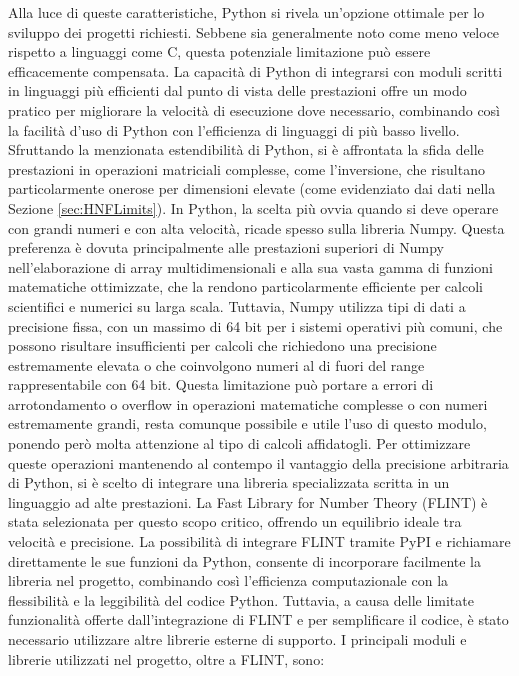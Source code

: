 Alla luce di queste caratteristiche, Python si rivela un'opzione ottimale per lo sviluppo 
dei progetti richiesti. Sebbene sia generalmente noto come meno veloce rispetto a 
linguaggi come C, questa potenziale limitazione può essere efficacemente compensata. 
La capacità di Python di integrarsi con moduli scritti in linguaggi più efficienti dal 
punto di vista delle prestazioni offre un modo pratico per migliorare la velocità di 
esecuzione dove necessario, combinando così la facilità d'uso di Python con l'efficienza 
di linguaggi di più basso livello.
Sfruttando la menzionata estendibilità di Python, si è affrontata la sfida delle prestazioni 
in operazioni matriciali complesse, come l'inversione, che risultano particolarmente onerose 
per dimensioni elevate (come evidenziato dai dati nella Sezione \ref{sec:HNFLimits}). 
In Python, la scelta più ovvia quando si deve operare con grandi numeri e con alta velocità,
ricade spesso sulla libreria Numpy. 
Questa preferenza è dovuta principalmente alle prestazioni superiori di Numpy nell'elaborazione 
di array multidimensionali e alla sua vasta gamma di funzioni matematiche ottimizzate, 
che la rendono particolarmente efficiente per calcoli scientifici e numerici su larga scala. 
Tuttavia, Numpy utilizza tipi di dati a precisione fissa, con un massimo di 64 bit per i 
sistemi operativi più comuni, che 
possono risultare insufficienti per calcoli che richiedono una precisione estremamente 
elevata o che coinvolgono numeri al di fuori del range rappresentabile con 64 bit. 
Questa limitazione può portare a errori di arrotondamento o overflow in operazioni 
matematiche complesse o con numeri estremamente grandi, resta comunque possibile e utile
l'uso di questo modulo, ponendo però molta attenzione al tipo di calcoli affidatogli.
Per ottimizzare queste operazioni mantenendo al contempo il vantaggio della precisione 
arbitraria di Python, si è scelto di integrare una libreria specializzata scritta in un 
linguaggio ad alte prestazioni. La Fast Library for Number Theory \cite{FLINT} (FLINT) è stata 
selezionata per questo scopo critico, offrendo un equilibrio ideale tra velocità e 
precisione.
La possibilità di integrare FLINT tramite PyPI e richiamare direttamente le sue funzioni 
da Python, consente di incorporare facilmente la libreria nel progetto, combinando così 
l'efficienza computazionale con la flessibilità e la leggibilità del codice Python. 
Tuttavia, a causa delle limitate funzionalità offerte dall'integrazione di FLINT e per 
semplificare il codice, è stato necessario utilizzare altre librerie esterne di supporto.
I principali moduli e librerie utilizzati nel progetto, oltre a FLINT, sono:

